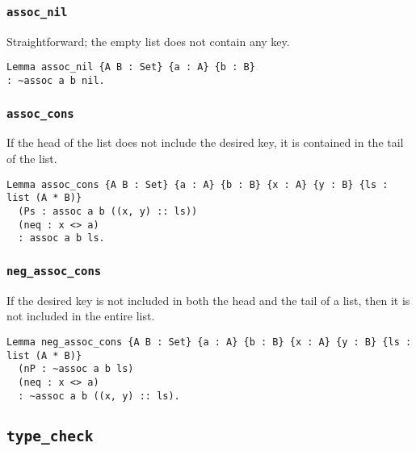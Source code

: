 \documentclass[a4paper, 10pt]{amsart}
\begin{document}
		\subsubsection{\lstinline{assoc_nil}}
	
		Straightforward; the empty list does not contain any key.		
\begin{lstlisting}
Lemma assoc_nil {A B : Set} {a : A} {b : B}
: ~assoc a b nil.
\end{lstlisting}

		\subsubsection{\lstinline{assoc_cons}}
		
		If the head of the list does not include the desired key, it is contained in the tail of the list.
\begin{lstlisting}
Lemma assoc_cons {A B : Set} {a : A} {b : B} {x : A} {y : B} {ls : list (A * B)}
  (Ps : assoc a b ((x, y) :: ls))
  (neq : x <> a)
  : assoc a b ls.
\end{lstlisting}

		\subsubsection{\lstinline{neg_assoc_cons}}

		If the desired key is not included in both the head and the tail of a list, then it is not included in the entire list.
\begin{lstlisting}
Lemma neg_assoc_cons {A B : Set} {a : A} {b : B} {x : A} {y : B} {ls : list (A * B)}
  (nP : ~assoc a b ls)
  (neq : x <> a)
  : ~assoc a b ((x, y) :: ls).
\end{lstlisting}

	\subsection{\lstinline{type_check}}
		
\end{document}
